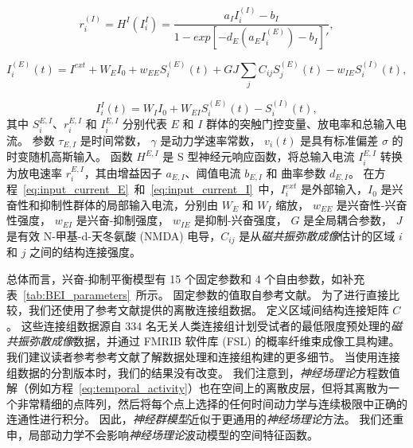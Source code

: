 \documentclass[lang=cn,a4paper,newtx,citestyle=gb7714-2015, bibstyle=gb7714-2015]{elegantpaper}
\begin{document}
\begin{equation}\label{eq:firing_rate_I}
	r_i^{(I)} = H^{I} (I_i^{I}) = \frac{a_I I_i^{(I)} - b_I}{1 - exp[-d_E (a_E I_i^{(E)}) - b_I]'},
\end{equation}

\begin{equation}\label{eq:input_current_E}
	I_i^{(E)}(t) = I^{ext} + W_E I_0 + w_{EE} S_i^{(E)} (t) + G J \sum_j C_{ij} S_j^{(E)}(t) - w_{IE} S_i^{(I)} (t), 
\end{equation}

\begin{equation}\label{eq:input_current_I}
	I_i^{I} (t) = W_I I_0 +
				  W_{EI} S_i^{(E)} (t) - 
				  S_i^{(I)} (t),
\end{equation}
%
其中 $ S_i^{E,I} $、$ r_i^{E, I} $ 和 $ I_i^{E, I} $ 分别代表 $ E $ 和 $ I $ 群体的突触门控变量、放电率和总输入电流。
参数 $ \tau_{E,I} $ 是时间常数，
$ \gamma $ 是动力学速率常数，
$ v_i (t) $ 是具有标准偏差 $ \sigma $ 的时变随机高斯输入。
函数 $ H^{E,I} $ 是 S 型神经元响应函数，将总输入电流 $ I_i^{E,I} $ 转换为放电速率 $ r_i^{E,I} $，其由增益因子 $ a_{E,I} $、阈值电流 $ b_{E,I} $ 和 曲率参数 $ d_{E,I} $。
在方程~\ref{eq:input_current_E}~和~\ref{eq:input_current_I}~中，$ I_i^{ext} $ 是外部输入，$ I_0 $ 是兴奋性和抑制性群体的局部输入电流，分别由 $ W_E $ 和 $ W_I $ 缩放，
$ w_{EE} $ 是兴奋性-兴奋性强度，
$ w_{EI} $ 是兴奋-抑制强度，
$ w_{IE} $ 是抑制-兴奋强度，
$ G $ 是全局耦合参数，
$ J $ 是有效 N-甲基-d-天冬氨酸 (NMDA) 电导，$ C_{ij} $ 是从\textit{磁共振弥散成像}估计的区域 $ i $ 和 $ j $ 之间的结构连接强度。


总体而言，兴奋-抑制平衡模型有 15 个固定参数和 4 个自由参数，如补充表~\ref{tab:BEI_parameters}~所示。
固定参数的值取自参考文献\cite{demirtacs2019hierarchical}。
为了进行直接比较，我们还使用了参考文献\cite{demirtacs2019hierarchical}提供的离散连接组数据。
定义区域间结构连接矩阵 $ C $。
这些连接组数据源自 334 名无关人类连接组计划受试者的最低限度预处理的\textit{磁共振弥散成像}数据，并通过 FMRIB 软件库 (FSL)\cite{behrens2003characterization} 的概率纤维束成像工具构建。 
我们建议读者参考参考文献\cite{demirtacs2019hierarchical}了解数据处理和连接组构建的更多细节。
当使用连接组数据的分割版本时，我们的结果没有改变。
我们注意到，\textit{神经场理论}方程数值解（例如方程~\ref{eq:temporal_activity}）也在空间上的离散皮层，但将其离散为一个非常精细的点阵列，然后将每个点上选择的任何时间动力学与连续极限中正确的连通性进行积分。
因此，\textit{神经群模型}近似于更通用的\textit{神经场理论}方法\cite{deco2008dynamic,spiegler2013systematic}。 
我们还重申，局部动力学不会影响\textit{神经场理论}波动模型的空间特征函数。
\end{document}
